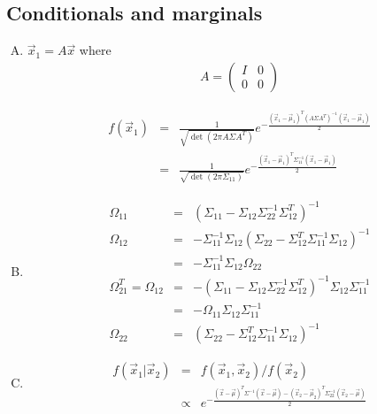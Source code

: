 \documentclass{article}
\begin{document}
\subsection{Conditionals and marginals}
\begin{enumerate}[(A)]
\item

$\vec{x}_1=A\vec{x}$ where
\begin{eqnarray}
A= \left( \begin{array}{cc}
I & 0   \\
0 & 0   \end{array} \right)
\end{eqnarray}

\begin{eqnarray}
f(\vec{x}_1)&=&\frac{1}{\sqrt{\det(2\pi A\Sigma A^T)}}e^{-\frac{(\vec{x}_1-\vec{\mu}_1)^T(A\Sigma A^T)^{-1}(\vec{x}_1-\vec{\mu}_1)}{2}}\nonumber\\
&=&\frac{1}{\sqrt{\det(2\pi\Sigma_{11})}}e^{-\frac{(\vec{x}_1-\vec{\mu}_1)^T\Sigma_{11}^{-1}(\vec{x}_1-\vec{\mu}_1)}{2}}
\end{eqnarray}

\item

\begin{eqnarray}
\Omega_{11}&=&(\Sigma_{11}-\Sigma_{12}\Sigma_{22}^{-1}\Sigma_{12}^T)^{-1}\\
\Omega_{12}&=&-\Sigma_{11}^{-1}\Sigma_{12}(\Sigma_{22}-\Sigma_{12}^T\Sigma_{11}^{-1}\Sigma_{12})^{-1}\nonumber\\
&=&-\Sigma_{11}^{-1}\Sigma_{12}\Omega_{22}\\
\Omega_{21}^T=\Omega_{12}&=&-(\Sigma_{11}-\Sigma_{12}\Sigma_{22}^{-1}\Sigma_{12}^T)^{-1}\Sigma_{12}\Sigma_{11}^{-1}\nonumber\\
&=&-\Omega_{11}\Sigma_{12}\Sigma_{11}^{-1}\\
\Omega_{22}&=&(\Sigma_{22}-\Sigma_{12}^T\Sigma_{11}^{-1}\Sigma_{12})^{-1}
\end{eqnarray}

\item

\begin{eqnarray}
f(\vec{x}_1|\vec{x}_2)&=&f(\vec{x}_1,\vec{x}_2)/f(\vec{x}_2)\nonumber\\
&\propto&e^{-\frac{(\vec{x}-\vec{\mu})^T\Sigma^{-1}(\vec{x}-\vec{\mu})-(\vec{x}_2-\vec{\mu}_2)^T\Sigma_{22}^{-1}(\vec{x}_2-\vec{\mu})}{2}}
\end{eqnarray}


\end{enumerate}
\end{document}
